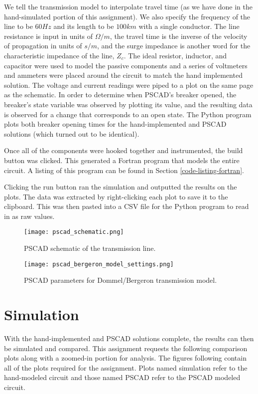 \documentclass[10pt, oneside, letterpaper]{article}
\begin{document}
We tell the transmission model to interpolate travel time (as we have done in the hand-simulated portion of this assignment). We also specify the frequency of the line to be $60 Hz$ and its length to be $100 km$ with a single conductor. The line resistance is input in units of $\Omega{}/m$, the travel time is the inverse of the velocity of propagation in units of $s/m$, and the surge impedance is another word for the characteristic impedance of the line, $Z_c$. The ideal resistor, inductor, and capacitor were used to model the passive components and a series of voltmeters and ammeters were placed around the circuit to match the hand implemented solution. The voltage and current readings were piped to a plot on the same page as the schematic. In order to determine when PSCAD's breaker opened, the breaker's state variable was observed by plotting its value, and the resulting data is observed for a change that corresponds to an open state. The Python program plots both breaker opening times for the hand-implemented and PSCAD solutions (which turned out to be identical).

Once all of the components were hooked together and instrumented, the build button was clicked. This generated a Fortran program that models the entire circuit. A listing of this program can be found in Section \ref{code-listing-fortran}.

Clicking the run button ran the simulation and outputted the results on the plots. The data was extracted by right-clicking each plot{} to save it to the clipboard. This was then pasted into a CSV file for the Python program to read in as raw values.

\begin{figure}[H]
\centering
\texttt{[image: pscad\_schematic.png]}
\caption{PSCAD schematic of the transmission line.}
\label{pscad-setup}
\end{figure}

\begin{figure}[H]
\centering
\texttt{[image: pscad\_bergeron\_model\_settings.png]}
\caption{PSCAD parameters for Dommel/Bergeron transmission model.}
\label{pscad-bergeron-settings}
\end{figure}

\section{Simulation}

With the hand-implemented and PSCAD solutions complete, the results can then be simulated and compared. This assignment requests the following comparison plots along with a zoomed-in portion for analysis. The figures following contain all of the plots required for the assignment. Plots named simulation refer to the hand-modeled circuit and those named PSCAD refer to the PSCAD modeled circuit.
\end{document}
